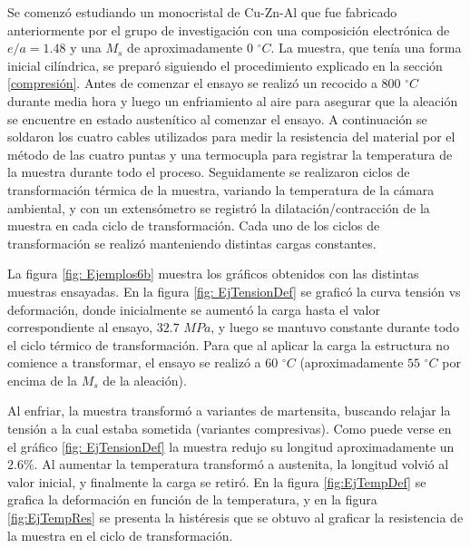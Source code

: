\documentclass[a4paper,12pt,fleqn,twoside,openany]{book}
\begin{document}
Se comenzó estudiando un monocristal de Cu-Zn-Al que fue fabricado anteriormente por el grupo de investigación con una composición electrónica de $e/a=1.48$ y una $M_s$ de aproximadamente $0$ $^\circ C$. La muestra, que tenía una forma inicial cilíndrica, se preparó siguiendo el procedimiento explicado en la sección \ref{compresión}. Antes de comenzar el ensayo se realizó un recocido a $800$ $ ^\circ C$ durante media hora y luego un enfriamiento al aire para asegurar que la aleación se encuentre en estado austenítico al comenzar el ensayo. A continuación se soldaron los cuatro cables utilizados para medir la resistencia del material por el método de las cuatro puntas y una termocupla para registrar la temperatura de la muestra durante todo el proceso. Seguidamente se realizaron ciclos de transformación térmica de la muestra, variando la temperatura de la cámara ambiental, y con un extensómetro se registró la dilatación/contracción de la muestra en cada ciclo de transformación. Cada uno de los ciclos de transformación se realizó manteniendo distintas cargas constantes. 

La figura \ref{fig: Ejemplos6b} muestra los gráficos obtenidos con las distintas muestras ensayadas. En la figura \ref{fig: EjTensionDef} se graficó la curva tensión vs deformación, donde inicialmente se aumentó la carga hasta el valor correspondiente al ensayo, $32.7$ $MPa$, y luego se mantuvo constante durante todo el ciclo térmico de transformación. Para que al aplicar la carga la estructura no comience a transformar, el ensayo se realizó a $60$ $^\circ C$ (aproximadamente $55$ $^\circ C$ por encima de la $M_s$ de la aleación).  


Al enfriar, la muestra transformó a variantes de martensita, buscando relajar la tensión a la cual estaba sometida (variantes compresivas). Como puede verse en el gráfico \ref{fig: EjTensionDef} la muestra redujo su longitud aproximadamente un $2.6\%$. Al aumentar la temperatura transformó a austenita, la longitud volvió al valor inicial, y finalmente la carga se retiró. En la figura \ref{fig:EjTempDef} se grafica la deformación en función de la temperatura, y en la figura \ref{fig:EjTempRes} se presenta la histéresis que se obtuvo al graficar la resistencia de la muestra en el ciclo de transformación. 

\end{document}
